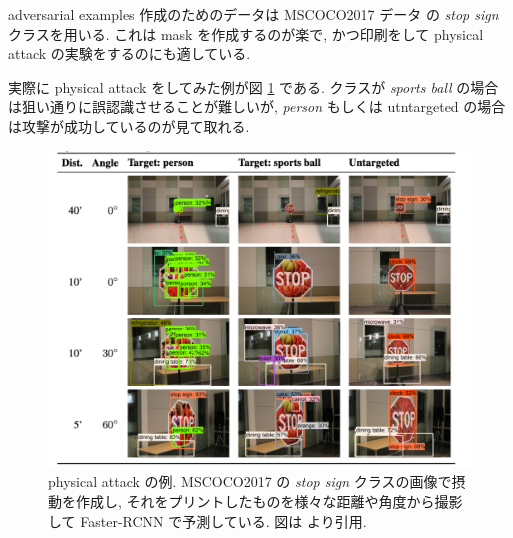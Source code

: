 adversarial examples 作成のためのデータは MSCOCO2017 データ \cite{lin2014microsoft} の {\it stop sign} クラスを用いる.
これは mask を作成するのが楽で, かつ印刷をして physical attack の実験をするのにも適している.

実際に physical attack をしてみた例が図 \ref{fig:shapeshifter-result-physical} である.
クラスが {\it sports ball} の場合は狙い通りに誤認識させることが難しいが, {\it person} もしくは utntargeted の場合は攻撃が成功しているのが見て取れる.
%
\begin{figure}[htbp]
\begin{center}
\includegraphics[width=14.0cm]{figures/shapeshifter-result-physical.pdf}
\end{center}
\caption{
physical attack の例.
MSCOCO2017 の {\it stop sign} クラスの画像で摂動を作成し, それをプリントしたものを様々な距離や角度から撮影して Faster-RCNN で予測している.
図は \cite{chen2018shapeshifter} より引用.
}
\label{fig:shapeshifter-result-physical}
\end{figure}
%

